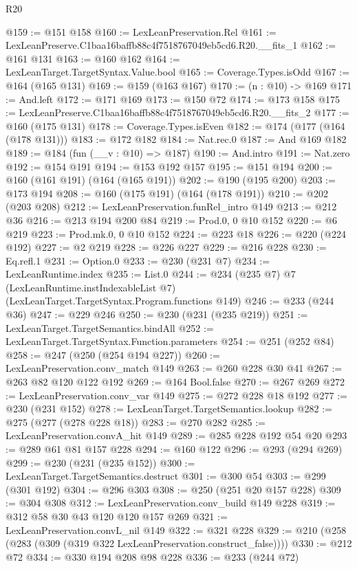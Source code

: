 \begin{lexlean}{R20}
\begin{coremodule}
@159 := @151 @158
@160 := LexLeanPreservation.Rel
@161 := LexLeanPreserve.C1baa16baffb88c4f7518767049eb5cd6.R20.__fits_1
@162 := @161 @131
@163 := @160 @162
@164 := LexLeanTarget.TargetSyntax.Value.bool
@165 := Coverage.Types.isOdd
@167 := @164 (@165 @131)
@169 := @159 (@163 @167)
@170 := (n : @10) -> @169
@171 := And.left
@172 := @171 @169
@173 := @150 @72
@174 := @173 @158
@175 := LexLeanPreserve.C1baa16baffb88c4f7518767049eb5cd6.R20.__fits_2
@177 := @160 (@175 @131)
@178 := Coverage.Types.isEven
@182 := @174 (@177 (@164 (@178 @131)))
@183 := @172 @182
@184 := Nat.rec.{0}
@187 := And @169 @182
@189 := @184 (fun (__v : @10) => @187)
@190 := And.intro
@191 := Nat.zero
@192 := @154 @191
@194 := @153 @192 @157
@195 := @151 @194
@200 := @160 (@161 @191) (@164 (@165 @191))
@202 := @190 (@195 @200)
@203 := @173 @194
@208 := @160 (@175 @191) (@164 (@178 @191))
@210 := @202 (@203 @208)
@212 := LexLeanPreservation.funRel_intro @149
@213 := @212 @36
@216 := @213 @194 @200 @84
@219 := Prod.{0, 0} @10 @152
@220 := @6 @219
@223 := Prod.mk.{0, 0} @10 @152
@224 := @223 @18
@226 := @220 (@224 @192)
@227 := @2 @219
@228 := @226 @227
@229 := @216 @228
@230 := Eq.refl.{1}
@231 := Option.{0}
@233 := @230 (@231 @7)
@234 := LexLeanRuntime.index
@235 := List.{0}
@244 := @234
    (@235 @7)
    @7
    (LexLeanRuntime.instIndexableList @7)
    (LexLeanTarget.TargetSyntax.Program.functions @149)
@246 := @233 (@244 @36)
@247 := @229 @246
@250 := @230 (@231 (@235 @219))
@251 := LexLeanTarget.TargetSemantics.bindAll
@252 := LexLeanTarget.TargetSyntax.Function.parameters
@254 := @251 (@252 @84)
@258 := @247 (@250 (@254 @194 @227))
@260 := LexLeanPreservation.conv_match @149
@263 := @260 @228 @30 @41
@267 := @263 @82 @120 @122 @192
@269 := @164 Bool.false
@270 := @267 @269
@272 := LexLeanPreservation.conv_var @149
@275 := @272 @228 @18 @192
@277 := @230 (@231 @152)
@278 := LexLeanTarget.TargetSemantics.lookup
@282 := @275 (@277 (@278 @228 @18))
@283 := @270 @282
@285 := LexLeanPreservation.convA_hit @149
@289 := @285 @228 @192 @54 @20
@293 := @289 @61 @81 @157 @228
@294 := @160 @122
@296 := @293 (@294 @269)
@299 := @230 (@231 (@235 @152))
@300 := LexLeanTarget.TargetSemantics.destruct
@301 := @300 @54
@303 := @299 (@301 @192)
@304 := @296 @303
@308 := @250 (@251 @20 @157 @228)
@309 := @304 @308
@312 := LexLeanPreservation.conv_build @149 @228
@319 := @312 @58 @30 @43 @120 @120 @157 @269
@321 := LexLeanPreservation.convL_nil @149
@322 := @321 @228
@329 := @210 (@258 (@283 (@309 (@319 @322 LexLeanPreservation.construct_false))))
@330 := @212 @72
@334 := @330 @194 @208 @98 @228
@336 := @233 (@244 @72)

\end{coremodule}
\end{lexlean}
